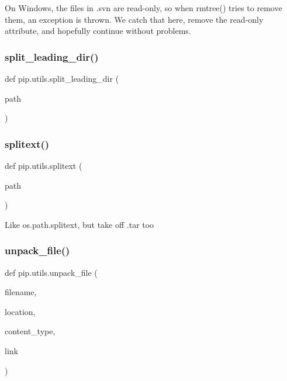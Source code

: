 \begin{DoxyVerb}On Windows, the files in .svn are read-only, so when rmtree() tries to
remove them, an exception is thrown.  We catch that here, remove the
read-only attribute, and hopefully continue without problems.\end{DoxyVerb}
 \mbox{\label{namespacepip_1_1utils_a45850f06f136546cf5a836e798995d8d}} 
\subsubsection{\texorpdfstring{split\+\_\+leading\+\_\+dir()}{split\_leading\_dir()}}
{\footnotesize\ttfamily def pip.\+utils.\+split\+\_\+leading\+\_\+dir (\begin{DoxyParamCaption}\item[{}]{path }\end{DoxyParamCaption})}

\mbox{\label{namespacepip_1_1utils_ad917756b1f0c6f2befbc8ac48d28ac10}} 
\subsubsection{\texorpdfstring{splitext()}{splitext()}}
{\footnotesize\ttfamily def pip.\+utils.\+splitext (\begin{DoxyParamCaption}\item[{}]{path }\end{DoxyParamCaption})}

\begin{DoxyVerb}Like os.path.splitext, but take off .tar too\end{DoxyVerb}
 \mbox{\label{namespacepip_1_1utils_a46929a9da8a55096a7474349dbf18728}} 
\subsubsection{\texorpdfstring{unpack\+\_\+file()}{unpack\_file()}}
{\footnotesize\ttfamily def pip.\+utils.\+unpack\+\_\+file (\begin{DoxyParamCaption}\item[{}]{filename,  }\item[{}]{location,  }\item[{}]{content\+\_\+type,  }\item[{}]{link }\end{DoxyParamCaption})}

